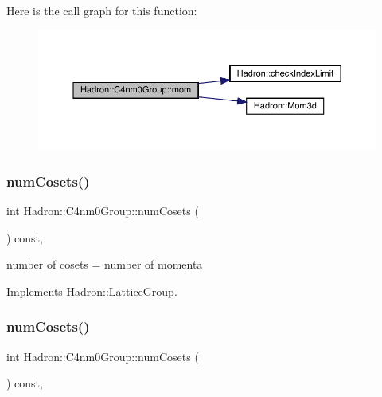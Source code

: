 Here is the call graph for this function\+:
\nopagebreak
\begin{figure}[H]
\begin{center}
\leavevmode
\includegraphics[width=350pt]{da/da1/structHadron_1_1C4nm0Group_a45599b94fa4633619247f4827e03ca23_cgraph}
\end{center}
\end{figure}
\mbox{\label{structHadron_1_1C4nm0Group_ad38f333075aa53f1b0c7bded9f7e70ad}} 
\subsubsection{\texorpdfstring{numCosets()}{numCosets()}\hspace{0.1cm}{\footnotesize\ttfamily [1/3]}}
{\footnotesize\ttfamily int Hadron\+::\+C4nm0\+Group\+::num\+Cosets (\begin{DoxyParamCaption}{ }\end{DoxyParamCaption}) const\hspace{0.3cm}{\ttfamily [inline]}, {\ttfamily [virtual]}}

number of cosets = number of momenta 

Implements \mbox{\hyperlink{structHadron_1_1LatticeGroup_afc76430f36a3a041f86d4058c59bf55e}{Hadron\+::\+Lattice\+Group}}.

\mbox{\label{structHadron_1_1C4nm0Group_ad38f333075aa53f1b0c7bded9f7e70ad}} 
\subsubsection{\texorpdfstring{numCosets()}{numCosets()}\hspace{0.1cm}{\footnotesize\ttfamily [2/3]}}
{\footnotesize\ttfamily int Hadron\+::\+C4nm0\+Group\+::num\+Cosets (\begin{DoxyParamCaption}{ }\end{DoxyParamCaption}) const\hspace{0.3cm}{\ttfamily [inline]}, {\ttfamily [virtual]}}

